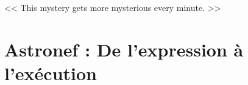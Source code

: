 \begin{savequote}[6cm]
<< This mystery gets more mysterious every minute. >>
\end{savequote}

\chapter{Astronef : De l'expression à l'exécution}
\chaptertoc






